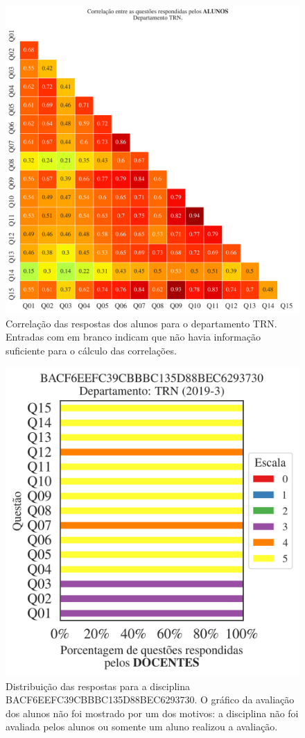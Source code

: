 \documentclass[a4paper,10pt]{article}
\begin{document}
\begin{figure}[h]
\centering
\includegraphics[width=0.999\linewidth]{matriz_corr__TRN_alunos.png}
\caption{\label{fig:corr_alunos}Correlação das respostas dos alunos para o departamento TRN. Entradas com em branco indicam que não havia informação suficiente para o cálculo das correlações.}
\end{figure}
\begin{figure}[h]
\centering
\includegraphics[width=0.485\linewidth]{analise_disciplina_departamento_TRN_BACF6EEFC39CBBBC135D88BEC6293730_docentes.png}
\caption{\label{fig:analise_geral_departamento}                Distribuição das respostas para a disciplina BACF6EEFC39CBBBC135D88BEC6293730. O gráfico da avaliação dos alunos não foi mostrado  por um dos motivos:  a disciplina não foi avaliada pelos alunos ou somente um aluno realizou a avaliação. }
\end{figure}
\end{document}
